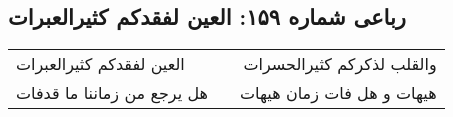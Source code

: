 \begin{center}
\section*{رباعی شماره ۱۵۹: العین لفقدکم کثیرالعبرات}
\label{sec:0159}
\begin{longtable}{l p{0.5cm} r}
العین لفقدکم کثیرالعبرات
&&
والقلب لذکرکم کثیرالحسرات
\\
هل یرجع من زماننا ما قدفات
&&
هیهات و هل فات زمان هیهات
\\
\end{longtable}
\end{center}
